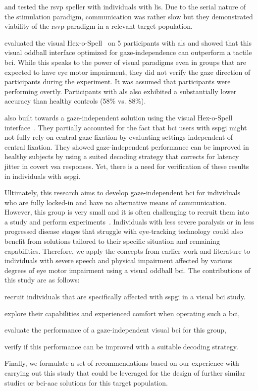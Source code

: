 \documentclass{article}
\begin{document}
\textcite{Orhan2012} and \textcite{Oken2014} tested the \ac{rsvp} speller with
individuals with \ac{lis}. Due to the serial nature of the stimulation paradigm,
communication was rather slow but they demonstrated viability of the \ac{rsvp}
paradigm in a relevant target population.

\textcite{Severens2014} evaluated the visual Hex-o-Spell~\cite{Treder2010} on 5
participants with \ac{als} and showed that this visual oddball interface optimized
for gaze-independence can outperform a tactile \ac{bci}.
While this speaks to the power of visual paradigms even in groups that are
expected to have eye motor impairment, they did not verify the gaze direction
of participants during the experiment.
It was assumed that participants were performing overtly.
Participants with \ac{als} also exhibited a substantially lower accuracy than healthy
controls (58\% vs. 88\%).

\textcite{VanDenKerchove2024} also built towards a gaze-independent solution
using the visual Hex-o-Spell interface~\cite{VanDenKerchove2024}.
They partially accounted for the fact that \ac{bci} users with \ac{sspgi} might
not fully rely on central gaze fixation by evaluating settings independent of
central fixation.
They showed gaze-independent performance can be improved in healthy subjects by
using a suited decoding strategy that corrects for latency jitter in covert \ac{vsa} responses.
Yet, there is a need for verification of these results in individuals with
\ac{sspgi}.

Ultimately, this research aims to develop gaze-independent \ac{bci} for
individuals who are fully locked-in and have no alternative means of communication.
However, this group is very small and it is often challenging to recruit them
into a study and perform experiments~\cite{Wolpaw2006}.
Individuals with less severe paralysis or in less progressed disease stages that struggle with
eye-tracking technology could also benefit from
solutions tailored to their specific situation and remaining capabilities.
Therefore, we apply the concepts from earlier work and literature to
individuals with severe speech and physical impairment affected by various degrees of eye motor impairment
using a visual oddball \ac{bci}.
The contributions of this study are as follows:
\begin{enumerate*}[label={(\arabic*)}]
	\item recruit individuals that are specifically affected with \ac{sspgi} in
	      a visual \ac{bci} study.
	\item explore their capabilities and experienced comfort when operating such a \ac{bci},
	\item evaluate the performance of a gaze-independent visual \ac{bci} for this
	      group,
	\item verify if this performance can be improved with a suitable decoding
	      strategy.
\end{enumerate*}
Finally, we formulate a set of recommendations based on our experience with carrying out this study
that could be leveraged for the design of further similar studies or \ac{bci}-\ac{aac} solutions for this target population.
\end{document}
